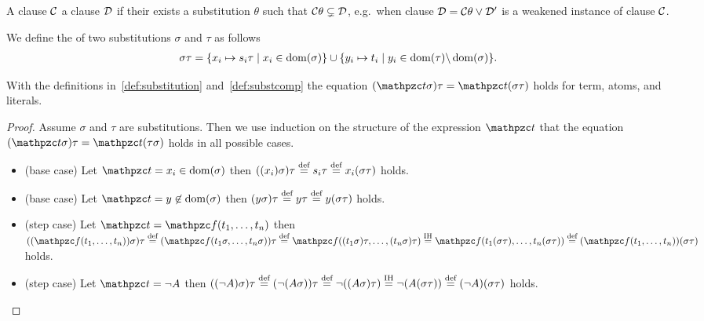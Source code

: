 \begin{definition}
	A clause \( \mcC \)  a clause \( \mcD \) if their exists a substitution \( \theta \) such that \( \mcC\theta \subsetneq \mcD \),
	e.g.~when clause \( \mcD = \mcC\theta \lor \mcD' \) is a weakened instance of clause \( \mcC \).
\end{definition}

\begin{definition}\label{def:substcomp}
We define the  of two substitutions \( \sigma \) and \( \tau \) as follows
	\begin{align*}
		\sigma\tau&=\{ x_i\mapsto s_i\tau\mid x_i\in\domain(\sigma) \}
		\cup
		\{ y_i\mapsto t_i\mid y_i\in\domain(\tau) \backslash \domain(\sigma) \}.
	\end{align*}
\end{definition}

\begin{lemma}\label{lem:substitution}
	With the definitions in~\ref{def:substitution} and~\ref{def:substcomp} the equation
	\( (\mct\sigma)\tau = \mct(\sigma\tau) \) holds for
	term, atoms, and literals.
\end{lemma}

\begin{proof}
	Assume \( \sigma \) and \( \tau \) are substitutions.
	Then we use induction on the structure of the 	expression \( \mct \)
	that the equation \( (\mct\sigma)\tau =  \mct(\tau\sigma) \) holds in all possible cases.
	\begin{itemize}
		\item (base case) Let \( \mct = x_i \in\domain(\sigma) \) then
		\( ((x_i)\sigma)\tau\defEQ s_i\tau\defEQ x_i(\sigma\tau) \) holds.

		\item (base case) Let \( \mct = y \not\in\domain(\sigma) \) then
		\( (y\sigma)\tau \defEQ y\tau \defEQ y(\sigma\tau) \) holds.

		\item (step case) Let \( \mct = \mcf(t_1,\ldots,t_n) \)
		then
		\(
			((\mcf(t_1,\ldots,t_n))\sigma)\tau
		\defEQ
		(\mcf(t_1\sigma,\ldots,t_n\sigma))\tau
		\defEQ
		\mcf((t_1\sigma)\tau,\ldots,(t_n\sigma)\tau)
		\defEQ[IH]
		\mcf(t_1(\sigma\tau),\ldots,t_n(\sigma\tau))
		\defEQ
		(\mcf(t_1,\ldots,t_n))(\sigma\tau)
		\) holds.

		\item (step case) Let \( \mct = \lnot A \) then
		\(
		((\lnot A)\sigma)\tau
		\defEQ
		(\lnot(A\sigma))\tau
		\defEQ
		\lnot((A\sigma)\tau)
		\defEQ[IH]
		\lnot(A(\sigma\tau))
		\defEQ
		(\lnot A)(\sigma\tau)
		\) holds.
	\end{itemize}
\end{proof}
